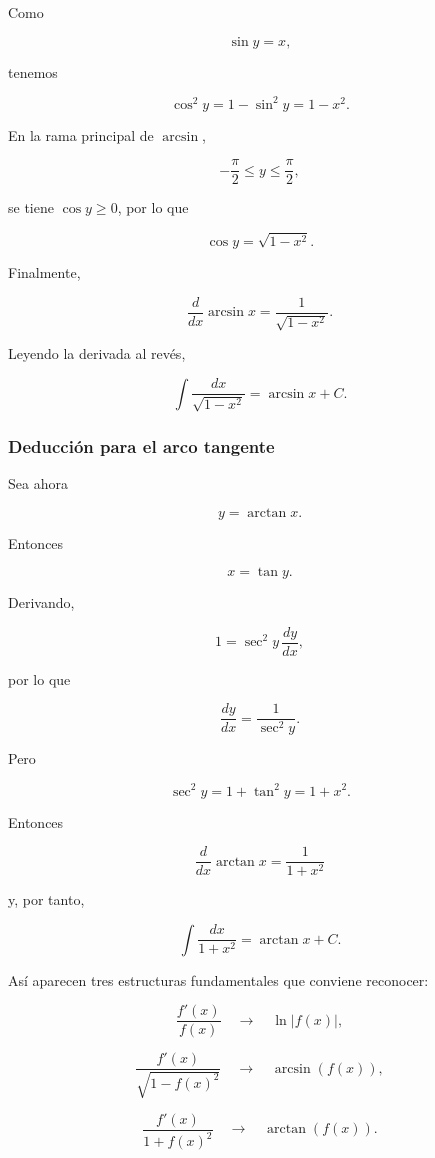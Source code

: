 Como

\[
\sin y=x,
\]

tenemos

\[
\cos^2y
=
1-\sin^2y
=
1-x^2.
\]

En la rama principal de \(\arcsin\),

\[
-\frac{\pi}{2}\le y\le\frac{\pi}{2},
\]

se tiene \(\cos y\ge0\), por lo que

\[
\cos y=\sqrt{1-x^2}.
\]

Finalmente,

\[
\boxed{
\frac{d}{dx}\arcsin x
=
\frac1{\sqrt{1-x^2}}
}.
\]

Leyendo la derivada al revés,

\[
\boxed{
\int\frac{dx}{\sqrt{1-x^2}}
=
\arcsin x+C.
}
\]

\subsubsection*{Deducción para el arco tangente}

Sea ahora

\[
y=\arctan x.
\]

Entonces

\[
x=\tan y.
\]

Derivando,

\[
1=\sec^2y\,\frac{dy}{dx},
\]

por lo que

\[
\frac{dy}{dx}
=
\frac1{\sec^2y}.
\]

Pero

\[
\sec^2y
=
1+\tan^2y
=
1+x^2.
\]

Entonces

\[
\boxed{
\frac{d}{dx}\arctan x
=
\frac1{1+x^2}
}
\]

y, por tanto,

\[
\boxed{
\int\frac{dx}{1+x^2}
=
\arctan x+C.
}
\]

Así aparecen tres estructuras fundamentales que conviene reconocer:

\[
\boxed{\frac{f'(x)}{f(x)}}
\quad\longrightarrow\quad
\ln|f(x)|,
\]

\[
\boxed{\frac{f'(x)}{\sqrt{1-f(x)^2}}}
\quad\longrightarrow\quad
\arcsin(f(x)),
\]

\[
\boxed{\frac{f'(x)}{1+f(x)^2}}
\quad\longrightarrow\quad
\arctan(f(x)).
\]

